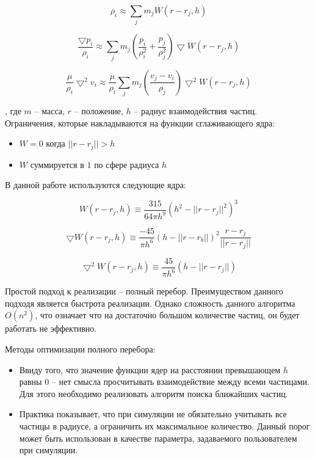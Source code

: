 \begin{equation}
\label{eq:}
  \rho_i \approx \sum_{j}m_jW(r - r_j, h)
\end{equation}

\begin{equation}
\label{eq:}
\frac{\bigtriangledown{}p_i}{\rho_i} \approx \sum_{j}m_j(\frac{p_i}{\rho_i^2} + \frac{p_j}{\rho_j^2})\bigtriangledown{}W(r - r_j, h)
\end{equation}

\begin{equation}
\label{eq:}
\frac{\mu}{\rho_i}\bigtriangledown^2v_i \approx \frac{\mu}{\rho_i}\sum_{j}m_j(\frac{v_j - v_i}{\rho_j})\bigtriangledown^2W(r - r_j, h)
\end{equation}

, где $m$ -- масса, $r$ -- положение, $h$ -- радиус взаимодействия частиц. \\

Ограничения, которые накладываются на функции сглаживающего ядра:

\begin{itemize}
  \item $W = 0$ когда $||r - r_j|| > h$
  \item $W$ суммируется в $1$ по сфере радиуса $h$
\end{itemize}

В данной работе используются следующие ядра:

\begin{equation}
\label{eq:}
W(r - r_j, h) \equiv \frac{315}{64\pi{}h^9}(h^2-||r-r_j||^2)^3
\end{equation}

\begin{equation}
\label{eq:}
\bigtriangledown{}W(r - r_j, h) \equiv \frac{-45}{\pi{}h^6}(h - ||r - r_b||)^2\frac{r - r_j}{||r - r_j||}
\end{equation}

\begin{equation}
\label{eq:}
\bigtriangledown^2W(r - r_j, h) \equiv \frac{45}{\pi{}h^6}(h - ||r - r_j||)
\end{equation}

Простой подход к реализации -- полный перебор. Преимуществом данного подходя является быстрота
реализации. Однако сложность данного алгоритма $O(n^2)$, что означает что на достаточно большом
количестве частиц, он будет работать не эффективно.

Методы оптимизации полного перебора:

\begin{itemize}
  \item Ввиду того, что значение функции ядер на расстоянии превышающем $h$ равны 0 -- нет смысла
    просчитывать взаимодействие между всеми частицами. Для этого необходимо реализовать
    алгоритм поиска ближайших частиц.
  \item Практика показывает, что при симуляции не обязательно учитывать все частицы в радиусе, а
    ограничить их максимальное количество. Данный порог может быть использован в качестве
    параметра, задаваемого пользователем при симуляции.
\end{itemize}

